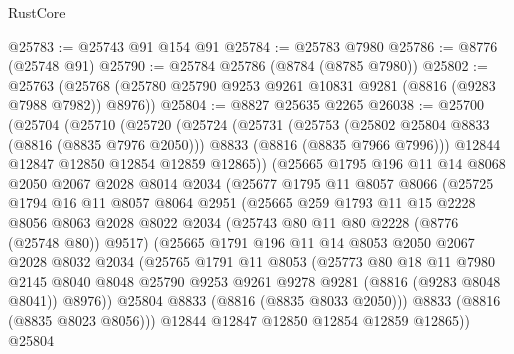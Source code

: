 \begin{lexlean}{RustCore}
\begin{coremodule}
@25783 := @25743 @91 @154 @91
@25784 := @25783 @7980
@25786 := @8776 (@25748 @91)
@25790 := @25784 @25786 (@8784 (@8785 @7980))
@25802 := @25763 (@25768 (@25780 @25790 @9253 @9261 @10831 @9281 (@8816 (@9283 @7988 @7982)) @8976))
@25804 := @8827 @25635 @2265
@26038 := @25700
    (@25704
      (@25710
        (@25720
          (@25724
            (@25731
              (@25753
                (@25802 @25804 @8833 (@8816 (@8835 @7976 @2050)))
                @8833
                (@8816 (@8835 @7966 @7996)))
              @12844
              @12847
              @12850
              @12854
              @12859
              @12865))
          (@25665
            @1795
            @196
            @11
            @14
            @8068
            @2050
            @2067
            @2028
            @8014
            @2034
            (@25677
              @1795
              @11
              @8057
              @8066
              (@25725
                @1794
                @16
                @11
                @8057
                @8064
                @2951
                (@25665
                  @259
                  @1793
                  @11
                  @15
                  @2228
                  @8056
                  @8063
                  @2028
                  @8022
                  @2034
                  (@25743 @80 @11 @80 @2228 (@8776 (@25748 @80)) @9517)
                  (@25665
                    @1791
                    @196
                    @11
                    @14
                    @8053
                    @2050
                    @2067
                    @2028
                    @8032
                    @2034
                    (@25765
                      @1791
                      @11
                      @8053
                      (@25773
                        @80
                        @18
                        @11
                        @7980
                        @2145
                        @8040
                        @8048
                        @25790
                        @9253
                        @9261
                        @9278
                        @9281
                        (@8816 (@9283 @8048 @8041))
                        @8976))
                    @25804
                    @8833
                    (@8816 (@8835 @8033 @2050)))
                  @8833
                  (@8816 (@8835 @8023 @8056)))
                @12844
                @12847
                @12850
                @12854
                @12859
                @12865))
            @25804

\end{coremodule}
\end{lexlean}
